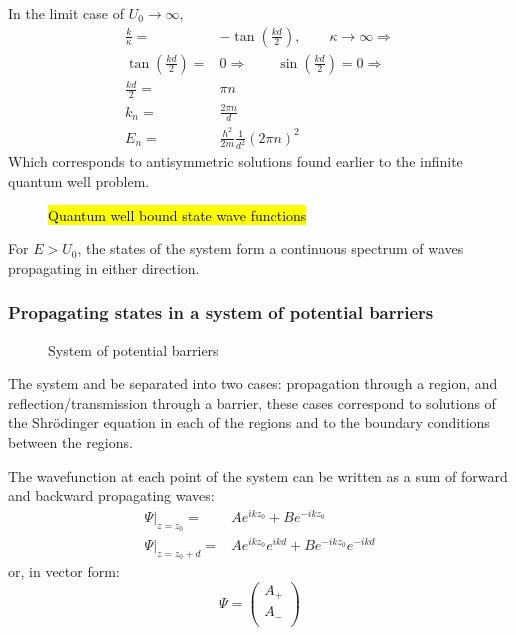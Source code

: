 				In the limit case of $U_0 \rightarrow \infty$,
				\begin{align}
					\frac{k}{\kappa} =& -\tan(\frac{kd}{2}),\qquad \kappa \rightarrow \infty \Rightarrow \\
					\tan(\frac{kd}{2}) =& 0 \Rightarrow\qquad	\sin(\frac{kd}{2}) = 0 \Rightarrow\\
					\frac{kd}{2} =& \pi n \\
					k_n =& \frac{2\pi n}{d} \\
					E_n =& \frac{\hbar^2}{2m}\frac{1}{d^2}\left(2\pi n\right)^2
				\end{align}
				Which corresponds to antisymmetric solutions found earlier to the infinite quantum well problem.		
				
			\begin{figure}[!h]
				\centering
				
				\caption{\hl{Quantum well bound state wave functions}}
			\end{figure}
			For $E > U_0$, the states of the system form a continuous spectrum of waves propagating in either direction.
		\subsubsection{Propagating states in a system of potential barriers}
			\begin{figure}[!h]
				\centering
				
				\caption{System of potential barriers}
			\end{figure}			
			The system and be separated into two cases: propagation through a region, and reflection/transmission through a barrier, these cases correspond to solutions of the Shr\"odinger equation in each of the regions and to the boundary conditions between the regions.
			
			The wavefunction at each point of the system can be written as a sum of forward and backward propagating waves:
			\begin{align}
				\Psi|_{z=z_{0}} =& Ae^{ikz_0} + Be^{-ikz_0} \\
				\Psi|_{z=z_{0}+d} =& Ae^{ikz_0}e^{ikd} + Be^{-ikz_0}e^{-ikd}				
			\end{align}
			or, in vector form:
			\begin{equation}
				\Psi = 
				\begin{pmatrix}
				A_+ \\
				A_- \\
				\end{pmatrix}
			\end{equation}
			
